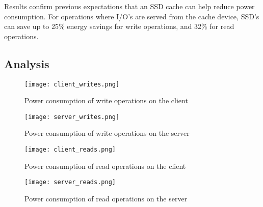 Results confirm previous expectations that an SSD cache can help reduce power
consumption. For operations where I/O's are served from the cache device, SSD's
can save up to 25\% energy savings for write operations, and 32\% for read
operations.

\subsection{Analysis}

\begin{figure}
  \caption{Power consumption of write operations on the client}
  \centering \texttt{[image: client\_writes.png]}
  \label{fig:client-writes}
\end{figure}

\begin{figure}
  \caption{Power consumption of write operations on the server}
  \centering \texttt{[image: server\_writes.png]}
  \label{fig:server-writes}
\end{figure}

\begin{figure}
  \caption{Power consumption of read operations on the client}
  \centering \texttt{[image: client\_reads.png]}
  \label{fig:client-reads}
\end{figure}

\begin{figure}
  \caption{Power consumption of read operations on the server}
  \centering \texttt{[image: server\_reads.png]}
  \label{fig:server-reads}
\end{figure}

